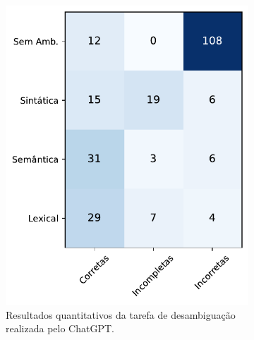 \begin{figure}[htb]
    \centering
    \begin{subfigure}[b]{0.45\textwidth}
        \includegraphics[width=\textwidth]{matriz_confusao_desamb_ChatGPT.pdf}
        \caption{Resultados quantitativos da tarefa de desambiguação realizada pelo ChatGPT.}
        \label{fig:matriz_confusao_chatgpt}
    \end{subfigure}
    \hfill
    \begin{subfigure}[b]{0.45\textwidth}

\end{subfigure}
\end{figure}
